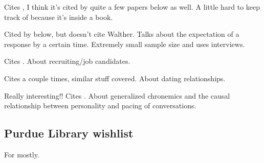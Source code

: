 \documentclass[
]{article}
\begin{document}
\textbf{}

Cites \textcite{walther95}, I think it's cited by quite a few papers
below as well. A little hard to keep track of because it's inside a
book.

\textbf{}

Cited by \textcite{kalman11} below, but doesn't cite Walther. Talks
about the expectation of a response by a certain time. Extremely small
sample size and uses interviews.

\textbf{}

Cites \textcite{walther95}. About recruiting/job candidates.

\textbf{}

Cites \textcite{walther95} a couple times, similar stuff covered. About
dating relationships.

\textbf{}

Really interesting!! Cites \textcite{walther95}. About generalized
chronemics and the causal relationship between personality and pacing of
conversations.

\hypertarget{purdue-library-wishlist}{%
\subsection{Purdue Library wishlist}\label{purdue-library-wishlist}}


For \textcite{doring09} mostly.

\printbibliography
\end{document}
